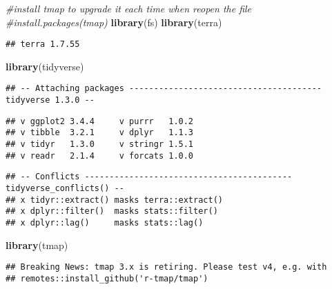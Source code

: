 \documentclass[
]{article}
\author{}
\date{\vspace{-2.5em}}
\newenvironment{Shaded}{\begin{snugshade}}{\end{snugshade}}
\newcommand{\CommentTok}[1]{\textcolor[rgb]{0.56,0.35,0.01}{\textit{#1}}}
\newcommand{\FunctionTok}[1]{\textcolor[rgb]{0.13,0.29,0.53}{\textbf{#1}}}
\newcommand{\NormalTok}[1]{#1}
\begin{document}
\begin{Shaded}
\begin{Highlighting}[]
\CommentTok{\#install tmap to upgrade it each time when reopen the file}
\CommentTok{\#install.packages(\textquotesingle{}tmap\textquotesingle{})}
\FunctionTok{library}\NormalTok{(fs)}
\FunctionTok{library}\NormalTok{(terra)}
\end{Highlighting}
\end{Shaded}

\begin{verbatim}
## terra 1.7.55
\end{verbatim}

\begin{Shaded}
\begin{Highlighting}[]
\FunctionTok{library}\NormalTok{(tidyverse)}
\end{Highlighting}
\end{Shaded}

\begin{verbatim}
## -- Attaching packages --------------------------------------- tidyverse 1.3.0 --
\end{verbatim}

\begin{verbatim}
## v ggplot2 3.4.4     v purrr   1.0.2
## v tibble  3.2.1     v dplyr   1.1.3
## v tidyr   1.3.0     v stringr 1.5.1
## v readr   2.1.4     v forcats 1.0.0
\end{verbatim}

\begin{verbatim}
## -- Conflicts ------------------------------------------ tidyverse_conflicts() --
## x tidyr::extract() masks terra::extract()
## x dplyr::filter()  masks stats::filter()
## x dplyr::lag()     masks stats::lag()
\end{verbatim}

\begin{Shaded}
\begin{Highlighting}[]
\FunctionTok{library}\NormalTok{(tmap)}
\end{Highlighting}
\end{Shaded}

\begin{verbatim}
## Breaking News: tmap 3.x is retiring. Please test v4, e.g. with
## remotes::install_github('r-tmap/tmap')
\end{verbatim}
\end{document}
